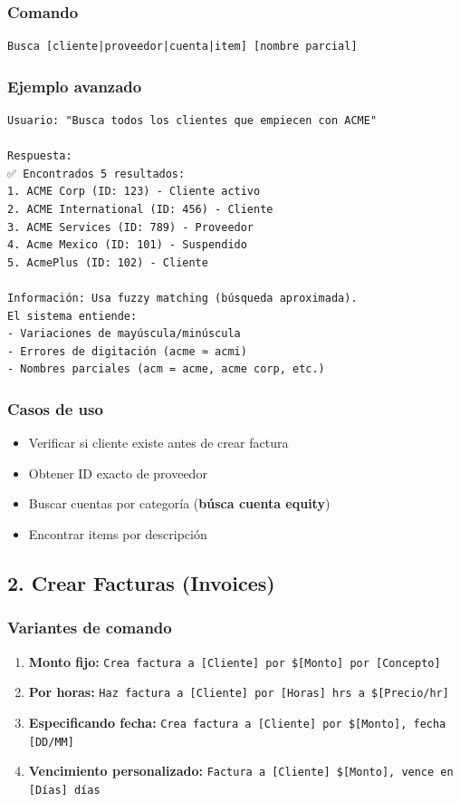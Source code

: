\documentclass[12pt,oneside]{article}
\begin{document}
\subsubsection{Comando}
\begin{verbatim}
Busca [cliente|proveedor|cuenta|item] [nombre parcial]
\end{verbatim}

\subsubsection{Ejemplo avanzado}

\begin{verbatim}
Usuario: "Busca todos los clientes que empiecen con ACME"

Respuesta:
✅ Encontrados 5 resultados:
1. ACME Corp (ID: 123) - Cliente activo
2. ACME International (ID: 456) - Cliente
3. ACME Services (ID: 789) - Proveedor
4. Acme Mexico (ID: 101) - Suspendido
5. AcmePlus (ID: 102) - Cliente

Información: Usa fuzzy matching (búsqueda aproximada).
El sistema entiende:
- Variaciones de mayúscula/minúscula
- Errores de digitación (acme ≈ acmi)
- Nombres parciales (acm = acme, acme corp, etc.)
\end{verbatim}

\subsubsection{Casos de uso}

\begin{itemize}
    \item Verificar si cliente existe antes de crear factura
    \item Obtener ID exacto de proveedor
    \item Buscar cuentas por categoría (\textbf{búsca cuenta equity})
    \item Encontrar items por descripción
\end{itemize}

\subsection{2. Crear Facturas (Invoices)}

\subsubsection{Variantes de comando}

\begin{enumerate}
    \item \textbf{Monto fijo:} \texttt{Crea factura a [Cliente] por \$[Monto] por [Concepto]}
    \item \textbf{Por horas:} \texttt{Haz factura a [Cliente] por [Horas] hrs a \$[Precio/hr]}
    \item \textbf{Especificando fecha:} \texttt{Crea factura a [Cliente] por \$[Monto], fecha [DD/MM]}
    \item \textbf{Vencimiento personalizado:} \texttt{Factura a [Cliente] \$[Monto], vence en [Días] días}
\end{enumerate}
\end{document}
